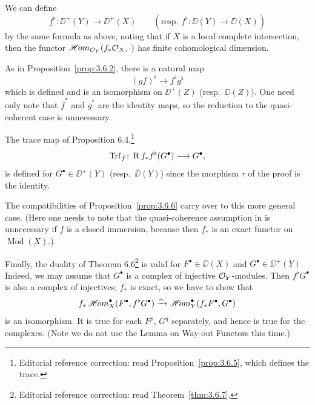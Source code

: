 We can define
\[
f^{\flat}\colon \DD^+(Y)\longrightarrow \DD^+(X) \qquad (\text{resp.\ } f^{\flat}\colon \DD(Y)\longrightarrow \DD(X))
\]
by the same formula as above, noting that if $X$ is a local complete intersection, then the functor $\mathop{\mathscr{H}\!om}\nolimits_{\mathcal{O}_Y}(f_*\mathcal{O}_X,\cdot)$ has finite cohomological dimension.

As in Proposition~\ref{prop:3.6.2}, there is a natural map
\[
(gf)^{\flat} \longrightarrow f^{\flat}g^{\flat}
\]
which is defined and is an isomorphism on $\DD^+(Z)$ (resp.\ $\DD(Z)$). One need only note that $\overline{f}^*$ and $\overline{g}^*$ are the identity maps, so the reduction to the quasi-coherent case is unnecessary.

The trace map of Proposition 6.4,\footnote{Editorial reference correction: read Proposition~\ref{prop:3.6.5}, which defines the trace.}
\[
\operatorname{Trf}_f \colon \operatorname{R} f_* f^{\flat}(G^\bullet) \longrightarrow G^\bullet,
\]
is defined for $G^\bullet\in\DD^+(Y)$ (resp.\ $\DD(Y)$) since the morphism $\tau$ of the proof is the identity.

The compatibilities of Proposition~\ref{prop:3.6.6} carry over to this more general case. (Here one needs to note that the quasi-coherence assumption in  is unnecessary if $f$ is a closed immersion, because then $f_*$ is an exact functor on $\operatorname{Mod}(X)$.)

Finally, the duality of Theorem 6.6\footnote{Editorial reference correction: read Theorem~\ref{thm:3.6.7}.} is valid for $F^\bullet\in\DD(X)$ and $G^\bullet\in\DD^+(Y)$. Indeed, we may assume that $G^\bullet$ is a complex of injective $\mathcal{O}_Y$-modules. Then $f^{\flat}G^\bullet$ is also a complex of injectives; $f_*$ is exact, so we have to show that
\[
f_*\mathop{\mathscr{H}\!om}\nolimits_X^\bullet(F^\bullet, f^{\flat}G^\bullet) \xrightarrow{\sim} \mathop{\mathscr{H}\!om}\nolimits_Y^\bullet(f_*F^\bullet, G^\bullet)
\]
is an isomorphism. It is true for each $F^p$, $G^q$ separately, and hence is true for the complexes. (Note we do not use the Lemma on Way-out Functors this time.)

